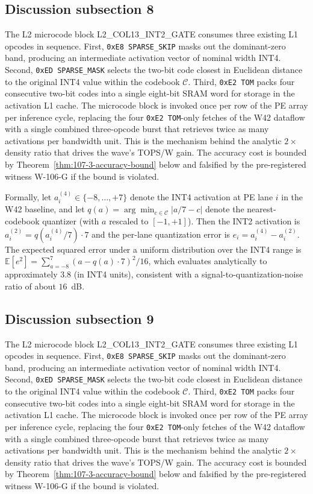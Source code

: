 \subsection{Discussion subsection 8}

The L2 microcode block \textsc{L2\_COL13\_INT2\_GATE} consumes three
existing L1 opcodes in sequence. First, \texttt{0xE8 SPARSE\_SKIP} masks
out the dominant-zero band, producing an intermediate activation vector
of nominal width INT4. Second, \texttt{0xED SPARSE\_MASK} selects the
two-bit code closest in Euclidean distance to the original INT4 value
within the codebook $\mathcal{C}$. Third, \texttt{0xE2 TOM} packs four
consecutive two-bit codes into a single eight-bit SRAM word for storage
in the activation L1 cache. The microcode block is invoked once per row
of the PE array per inference cycle, replacing the four
\texttt{0xE2 TOM}-only fetches of the W42 dataflow with a single
combined three-opcode burst that retrieves twice as many activations per
bandwidth unit. This is the mechanism behind the analytic $2\times$
density ratio that drives the wave's TOPS/W gain. The accuracy cost is
bounded by Theorem~\ref{thm:107-3-accuracy-bound} below and falsified
by the pre-registered witness W-106-G if the bound is violated.

Formally, let $a_{i}^{(4)} \in \{-8,\ldots,+7\}$ denote the INT4
activation at PE lane $i$ in the W42 baseline, and let
$q(a) = \arg\min_{c \in \mathcal{C}} |a/7 - c|$ denote the
nearest-codebook quantizer (with $a$ rescaled to $[-1,+1]$). Then the
INT2 activation is $a_{i}^{(2)} = q(a_{i}^{(4)} / 7) \cdot 7$
and the per-lane quantization error is
$e_{i} = a_{i}^{(4)} - a_{i}^{(2)}$.
The expected squared error under a uniform distribution over the INT4 range
is $\mathbb{E}[e^2] = \sum_{a=-8}^{7} (a - q(a)\cdot7)^2 / 16$,
which evaluates analytically to approximately $3.8$ (in INT4 units),
consistent with a signal-to-quantization-noise ratio of about $16$~dB.


\subsection{Discussion subsection 9}

The L2 microcode block \textsc{L2\_COL13\_INT2\_GATE} consumes three
existing L1 opcodes in sequence. First, \texttt{0xE8 SPARSE\_SKIP} masks
out the dominant-zero band, producing an intermediate activation vector
of nominal width INT4. Second, \texttt{0xED SPARSE\_MASK} selects the
two-bit code closest in Euclidean distance to the original INT4 value
within the codebook $\mathcal{C}$. Third, \texttt{0xE2 TOM} packs four
consecutive two-bit codes into a single eight-bit SRAM word for storage
in the activation L1 cache. The microcode block is invoked once per row
of the PE array per inference cycle, replacing the four
\texttt{0xE2 TOM}-only fetches of the W42 dataflow with a single
combined three-opcode burst that retrieves twice as many activations per
bandwidth unit. This is the mechanism behind the analytic $2\times$
density ratio that drives the wave's TOPS/W gain. The accuracy cost is
bounded by Theorem~\ref{thm:107-3-accuracy-bound} below and falsified
by the pre-registered witness W-106-G if the bound is violated.

